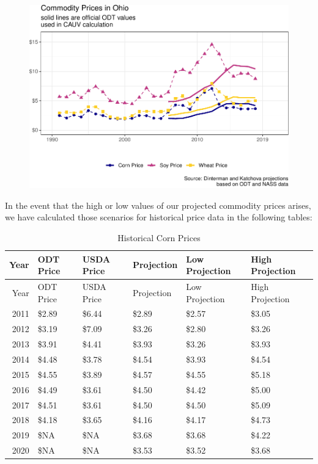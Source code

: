 \documentclass[]{article}
\begin{document}
\begin{figure}[H]
\includegraphics[width=1\linewidth]{4-projections-2019-2020_files/figure-latex/viz-prices-1} \caption{\label{fig:prices}}\label{fig:viz-prices}
\end{figure}

In the event that the high or low values of our projected commodity
prices arises, we have calculated those scenarios for historical price
data in the following tables:

\begin{longtable}[]{@{}rlllll@{}}
\caption{Historical Corn Prices}\tabularnewline
\toprule
Year & ODT Price & USDA Price & Projection & Low Projection & High
Projection\tabularnewline
\midrule
\endfirsthead
\toprule
Year & ODT Price & USDA Price & Projection & Low Projection & High
Projection\tabularnewline
\midrule
\endhead
2011 & \$2.89 & \$6.44 & \$2.89 & \$2.57 & \$3.05\tabularnewline
2012 & \$3.19 & \$7.09 & \$3.26 & \$2.80 & \$3.26\tabularnewline
2013 & \$3.91 & \$4.41 & \$3.93 & \$3.26 & \$3.93\tabularnewline
2014 & \$4.48 & \$3.78 & \$4.54 & \$3.93 & \$4.54\tabularnewline
2015 & \$4.55 & \$3.89 & \$4.57 & \$4.55 & \$5.18\tabularnewline
2016 & \$4.49 & \$3.61 & \$4.50 & \$4.42 & \$5.00\tabularnewline
2017 & \$4.51 & \$3.61 & \$4.50 & \$4.50 & \$5.09\tabularnewline
2018 & \$4.18 & \$3.65 & \$4.16 & \$4.17 & \$4.73\tabularnewline
2019 & \$NA & \$NA & \$3.68 & \$3.68 & \$4.22\tabularnewline
2020 & \$NA & \$NA & \$3.53 & \$3.52 & \$3.68\tabularnewline
\bottomrule
\end{longtable}
\end{document}
